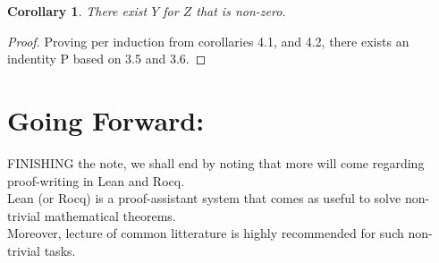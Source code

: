 \documentclass[10pt]{article}
\theoremstyle{plain}
\newtheorem{corollary}[theorem]{Corollary}
\theoremstyle{definition}
\theoremstyle{remark}
\begin{document}
\begin{corollary}
	There exist $Y$ for $Z$ that is non-zero.
\end{corollary}

\begin{proof}
	Proving per induction from corollaries 4.1, and 4.2, there exists an indentity P based on 3.5 and 3.6.
\end{proof}

\section{Going Forward:}

\lettrine[lines=2, lhang=0.1, loversize=0.2]{F}INISHING the note, we shall end by noting that more will come regarding proof-writing in Lean and Rocq.\\Lean (or Rocq) is a proof-assistant system that comes as useful to solve non-trivial mathematical theorems.\\Moreover, lecture of common litterature is highly recommended for such non-trivial tasks.

\nocite{*}





\end{document}
